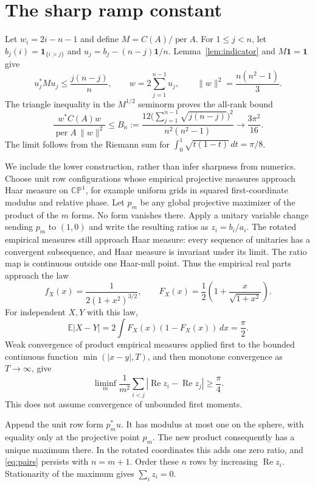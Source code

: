\documentclass[11pt]{article}
\DeclareMathOperator{\per}{per}
\DeclareMathOperator{\Ree}{Re}
\newcommand{\one}{\mathbf 1}
\newcommand{\CP}{\mathbb {CP}}
\begin{document}
\section{The sharp ramp constant}
Let $w_i=2i-n-1$ and define $M=C(A)/\per A$. For $1\le j<n$, let
$b_j(i)=\one_{\{i>j\}}$ and $u_j=b_j-(n-j)\one/n$. Lemma~\ref{lem:indicator}
and $M\one=\one$ give
\[
 u_j^*Mu_j\le\frac{j(n-j)}n,
 \qquad w=2\sum_{j=1}^{n-1}u_j,
 \qquad\|w\|^2=\frac{n(n^2-1)}3.
\]
The triangle inequality in the $M^{1/2}$ seminorm proves the all-rank bound
\begin{equation}\label{eq:ramp}
 \frac{w^*C(A)w}{\per A\,\|w\|^2}
 \le B_n:=\frac{12\bigl(\sum_{j=1}^{n-1}\sqrt{j(n-j)}\bigr)^2}
                 {n^2(n^2-1)}
 \longrightarrow\frac{3\pi^2}{16}.
\end{equation}
The limit follows from the Riemann sum for
$\int_0^1\sqrt{t(1-t)}\,dt=\pi/8$.

We include the lower construction, rather than infer sharpness from numerics.
Choose unit row configurations whose empirical projective measures approach
Haar measure on $\CP^1$, for example uniform grids in squared first-coordinate
modulus and relative phase. Let $p_m$ be any global projective maximizer of the
product of the $m$ forms. No form vanishes there. Apply a unitary variable change
sending $p_m$ to $(1,0)$ and write the resulting ratios as $z_i=b_i/a_i$.
The rotated empirical measures still approach Haar measure: every sequence of
unitaries has a convergent subsequence, and Haar measure is invariant under
its limit. The ratio map is continuous outside one Haar-null point.
Thus the empirical real parts approach the law
\[
 f_X(x)=\frac1{2(1+x^2)^{3/2}},\qquad
 F_X(x)=\frac12\left(1+\frac{x}{\sqrt{1+x^2}}\right).
\]
For independent $X,Y$ with this law,
\[
 \mathbb E|X-Y|=2\int F_X(x)(1-F_X(x))\,dx=\frac\pi2.
\]
Weak convergence of product empirical measures applied first to the bounded
continuous function $\min(|x-y|,T)$, and then monotone convergence as
$T\to\infty$, give
\begin{equation}\label{eq:pairs}
 \liminf_m\frac1{m^2}\sum_{i<j}|\Ree z_i-\Ree z_j|\ge\frac\pi4.
\end{equation}
This does not assume convergence of unbounded first moments.

Append the unit row form $p_m^*u$. It has modulus at most one on the sphere,
with equality only at the projective point $p_m$. The new product consequently
has a unique maximum there. In the rotated coordinates this adds one zero
ratio, and \eqref{eq:pairs} persists with $n=m+1$. Order these $n$ rows by
increasing $\Ree z_i$. Stationarity of the maximum gives $\sum_i z_i=0$.
\end{document}
